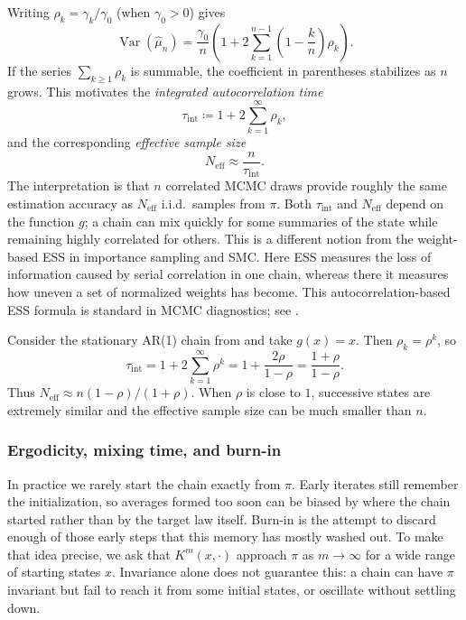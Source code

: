 Writing $\rho_k=\gamma_k/\gamma_0$ (when $\gamma_0>0$) gives
\[
\operatorname{Var}(\hat\mu_n)
= \frac{\gamma_0}{n}\left(1 + 2\sum_{k=1}^{n-1}\left(1-\frac{k}{n}\right)\rho_k\right).
\]
If the series $\sum_{k\ge 1}\rho_k$ is summable, the coefficient in parentheses stabilizes as $n$ grows.
This motivates the \emph{integrated autocorrelation time}
\[
\tau_{\mathrm{int}} \coloneqq 1+2\sum_{k=1}^{\infty}\rho_k,
\]
and the corresponding \emph{effective sample size}
\[
N_{\mathrm{eff}} \approx \frac{n}{\tau_{\mathrm{int}}}.
\]
The interpretation is that $n$ correlated MCMC draws provide roughly the same estimation accuracy as $N_{\mathrm{eff}}$ i.i.d.\ samples from $\pi$.
Both $\tau_{\mathrm{int}}$ and $N_{\mathrm{eff}}$ depend on the function $g$; a chain can mix quickly for some summaries of the state while remaining highly correlated for others.
This is a different notion from the weight-based ESS in importance sampling and SMC.
Here ESS measures the loss of information caused by serial correlation in one chain, whereas there it measures how uneven a set of normalized weights has become.
This autocorrelation-based ESS formula is standard in MCMC diagnostics; see \citet[\S2.2, p.~11]{betancourt_2017_hmc_conceptual}.

\begin{example}
Consider the stationary AR(1) chain from  and take $g(x)=x$.
Then $\rho_k=\rho^k$, so
\[
\tau_{\mathrm{int}} = 1+2\sum_{k=1}^{\infty}\rho^k = 1+\frac{2\rho}{1-\rho} = \frac{1+\rho}{1-\rho}.
\]
Thus $N_{\mathrm{eff}}\approx n(1-\rho)/(1+\rho)$.
When $\rho$ is close to $1$, successive states are extremely similar and the effective sample size can be much smaller than $n$.
\end{example}

\subsubsection{Ergodicity, mixing time, and burn-in}
\label{subsec:ergodicity}

In practice we rarely start the chain exactly from \(\pi\).
Early iterates still remember the initialization, so averages formed too soon can be biased by where the chain started rather than by the target law itself.
Burn-in is the attempt to discard enough of those early steps that this memory has mostly washed out.
To make that idea precise, we ask that \(K^m(x,\cdot)\) approach \(\pi\) as \(m\to\infty\) for a wide range of starting states \(x\).
Invariance alone does not guarantee this: a chain can have \(\pi\) invariant but fail to reach it from some initial states, or oscillate without settling down.

